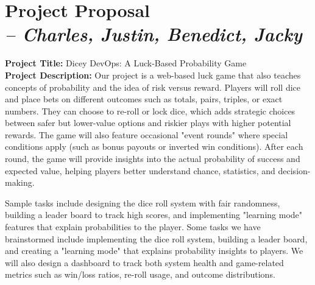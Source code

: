 \chapter[Project Proposal]{Project Proposal\\\small{\textit{-- Charles, Justin, Benedict, Jacky}}}
\label{Chapter::Project Proposal}





\textbf{Project Title:} Dicey DevOps: A Luck-Based Probability Game
\\

\textbf{Project Description:} Our project is a web-based luck game that also teaches concepts of probability and the idea of risk versus reward. Players will roll dice and place bets on different outcomes such as totals, pairs, triples, or exact numbers. They can choose to re-roll or lock dice, which adds strategic choices between safer but lower-value options and riskier plays with higher potential rewards. The game will also feature occasional "event rounds" where special conditions apply (such as bonus payouts or inverted win conditions). After each round, the game will provide insights into the actual probability of success and expected value, helping players better understand chance, statistics, and decision-making.

Sample tasks include designing the dice roll system with fair randomness, building a leader board to track high scores, and implementing "learning mode" features that explain probabilities to the player. Some tasks we have brainstormed include implementing the dice roll system, building a leader board, and creating a "learning mode" that explains probability insights to players. We will also design a dashboard to track both system health and game-related metrics such as win/loss ratios, re-roll usage, and outcome distributions.

